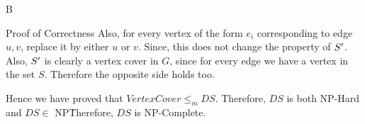 \documentclass{article}
\begin{document}
\begin{question}
\begin{qpart}{B}
\begin{qsubsection}{Proof of Correctness}
			Also, for every vertex of the form $e_i$ corresponding to edge $u, v$, replace it by either $u$ or $v$. Since, this does not change the property of $S^{\prime}$. Also, $S^{\prime}$ is clearly a vertex cover in $G$, since for every edge we have a vertex in the set $S$. Therefore the opposite side holds too.

		\end{qsubsection}

		Hence we have proved that $VertexCover \le _m DS$. Therefore, $DS$ is both NP-Hard and $DS \in$ NP\. Therefore, $DS$ is NP-Complete.

	\end{qpart}
\end{question}
\end{document}
